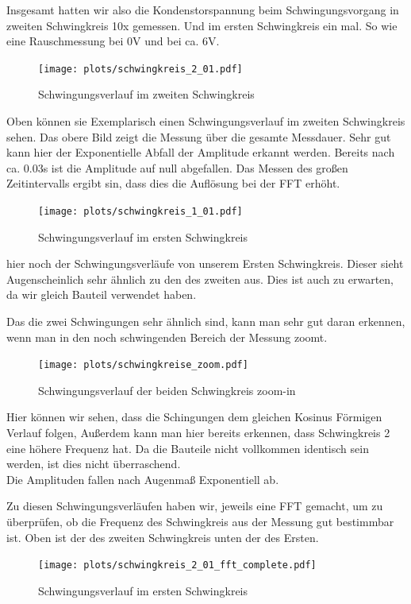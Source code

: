 \documentclass[twoside]{protokoll}
\begin{document}
Insgesamt hatten wir also die Kondenstorspannung beim Schwingungsvorgang in zweiten Schwingkreis 10x gemessen. Und im ersten Schwingkreis ein mal. 
So wie eine Rauschmessung bei 0V und bei ca. 6V. 

\begin{figure}[H]
    \centering
    \texttt{[image: plots/schwingkreis\_2\_01.pdf]}
    \caption{Schwingungsverlauf im zweiten Schwingkreis}
\end{figure}

Oben können sie Exemplarisch einen Schwingungsverlauf im zweiten Schwingkreis sehen. 
Das obere Bild zeigt die Messung über die gesamte Messdauer. 
Sehr gut kann hier der Exponentielle Abfall der Amplitude erkannt werden. Bereits nach ca. 0.03s ist die Amplitude auf null abgefallen. 
Das Messen des großen Zeitintervalls ergibt sin, dass dies die Auflösung bei der FFT erhöht.
\begin{figure}[H]
    \centering
    \texttt{[image: plots/schwingkreis\_1\_01.pdf]}
    \caption{Schwingungsverlauf im ersten Schwingkreis}
\end{figure}
hier noch der Schwingungsverläufe von unserem Ersten Schwingkreis. Dieser sieht Augenscheinlich sehr ähnlich zu den des zweiten aus.
Dies ist auch zu erwarten, da wir gleich Bauteil verwendet haben.

Das die zwei Schwingungen sehr ähnlich sind, kann man sehr gut daran erkennen, wenn man in den noch schwingenden Bereich der Messung zoomt.
\begin{figure}[H]
    \centering
    \texttt{[image: plots/schwingkreise\_zoom.pdf]}
    \caption{Schwingungsverlauf der beiden Schwingkreis zoom-in}
\end{figure}
Hier können wir sehen, dass die Schingungen dem gleichen Kosinus Förmigen Verlauf folgen, Außerdem kann man hier bereits erkennen, dass Schwingkreis 2 eine höhere Frequenz hat.
Da die Bauteile nicht vollkommen identisch sein werden, ist dies nicht überraschend.\\
Die Amplituden fallen nach Augenmaß Exponentiell ab.

Zu diesen Schwingungsverläufen haben wir, jeweils eine FFT gemacht, um zu überprüfen, ob die Frequenz des Schwingkreis aus der Messung gut bestimmbar ist.
Oben ist der des zweiten Schwingkreis unten der des Ersten.


\begin{figure}[H]
    \centering
    \texttt{[image: plots/schwingkreis\_2\_01\_fft\_complete.pdf]}
    \caption{Schwingungsverlauf im ersten Schwingkreis}
\end{figure}
\end{document}

